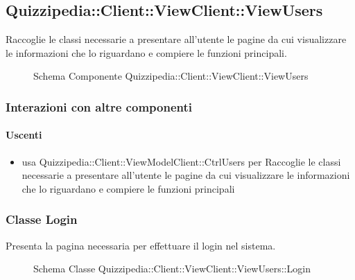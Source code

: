 \subsection{Quizzipedia::Client::ViewClient::ViewUsers}
Raccoglie le classi necessarie a presentare all'utente le pagine da cui visualizzare le informazioni che lo riguardano e compiere le funzioni principali.
\begin{figure}[H]
\centering
\noindent{}
\caption[Schema Componente Quizzipedia::Client::ViewClient::ViewUsers]{Schema Componente Quizzipedia::Client::ViewClient::ViewUsers}
\end{figure}
\subsubsection{Interazioni con altre componenti}
\paragraph{Uscenti}
\begin{itemize}
\item usa Quizzipedia::Client::ViewModelClient::CtrlUsers per Raccoglie le classi necessarie a presentare all'utente le pagine da cui visualizzare le informazioni che lo riguardano e compiere le funzioni principali
\end{itemize}
\subsubsection{Classe Login}
Presenta la pagina necessaria per effettuare il login nel sistema.
\begin{figure}[H]
\centering
\noindent{}
\caption[Schema Classe Login]{Schema Classe Quizzipedia::Client::ViewClient::ViewUsers::Login}
\end{figure}
